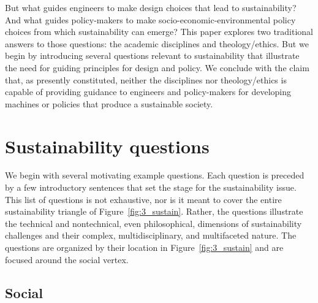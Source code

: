 \documentclass[12pt]{article}
\newcommand{\ins}[1]{\textcolor{red}{#1}}
\begin{document}
But what guides engineers to make design choices that lead to sustainability?
And what guides policy-makers to make socio-economic-environmental
policy choices from which sustainability can emerge?
This paper explores two traditional answers to those questions:
the academic disciplines and theology/ethics.
But we begin by introducing several questions relevant to sustainability
that illustrate the need for guiding principles for design and policy.
We conclude with the claim that, as presently constituted, 
neither the disciplines nor theology/ethics is capable of providing
guidance to engineers and policy-makers
for developing machines or policies that 
produce a sustainable society.


\section{Sustainability questions}
\label{sec:sustainability_questions}

We begin with several motivating example questions.
Each question is preceded by a few introductory sentences that set the stage for the 
sustainability issue.
This list of questions is not exhaustive, 
nor is it meant to cover the entire sustainability triangle of 
Figure~\ref{fig:3_sustain}.
Rather, the questions illustrate the 
technical and nontechnical, even philosophical, dimensions of sustainability challenges
and their
complex, multidisciplinary, and multifaceted 
nature. 
The questions are organized by their location in Figure~\ref{fig:3_sustain}
and are focused around the social vertex.


\subsection{Social}
\label{sec:social}
\end{document}
